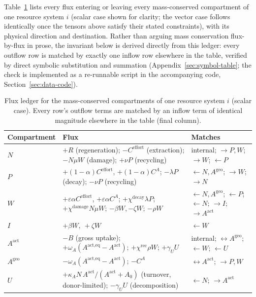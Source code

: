 \documentclass[twocolumn,10pt]{article}
\begin{document}
Table~\ref{tab:ledger} lists every flux entering or leaving every mass-conserved compartment of one resource system $i$ (scalar case shown for clarity; the vector case follows identically once the tensors above satisfy their stated constraints), with its physical direction and destination. Rather than arguing mass conservation flux-by-flux in prose, the invariant below is derived directly from this ledger: every outflow row is matched by exactly one inflow row elsewhere in the table, verified by direct symbolic substitution and summation (Appendix~\ref{sec:symbol-table}; the check is implemented as a re-runnable script in the accompanying code, Section~\ref{sec:data-code}).
\begin{table}[h]
\centering
\small
\caption{Flux ledger for the mass-conserved compartments of one resource system $i$ (scalar case). Every row's outflow terms are matched by an inflow term of identical magnitude elsewhere in the table (final column).}
\label{tab:ledger}
\begin{tabular}{lp{4.3cm}l}
\toprule
\textbf{Compartment} & \textbf{Flux} & \textbf{Matches} \\
\midrule
$N$ & $+R$ (regeneration); $-C^{\text{effort}}$ (extraction); $-N\mu W$ (damage); $+\nu P$ (recycling) & internal; $\to P,W$; $\to W$; $\leftarrow P$ \\
\midrule
$P$ & $+(1-\alpha)C^{\text{effort}}$, $+(1-\alpha)C^A$; $-\lambda P$ (decay); $-\nu P$ (recycling) & $\leftarrow N,A^{\text{geo}}$; $\to W$; $\to N$ \\
\midrule
$W$ & $+\varepsilon\alpha C^{\text{effort}}$, $+\varepsilon\alpha C^A$; $+\chi^{\text{decay}}\lambda P$; $+\chi^{\text{damage}} N\mu W$; $-\beta W,-\zeta W$; $-\rho W$ & $\leftarrow N,A^{\text{geo}}$; $\leftarrow P$; $\leftarrow N$; $\to I$; $\to A^{\text{act}}$ \\
\midrule
$I$ & $+\beta W,\ +\zeta W$ & $\leftarrow W$ \\
\midrule
$A^{\text{act}}$ & $-B$ (gross uptake); $+\omega_A(A^{\text{act,eq}}-A^{\text{act}})$; $+\chi^{\text{rec}}\rho W$; $+\gamma_U U$ & internal; $\leftrightarrow A^{\text{geo}}$; $\leftarrow W$; $\leftarrow U$ \\
\midrule
$A^{\text{geo}}$ & $-\omega_A(A^{\text{act,eq}}-A^{\text{act}})$; $-C^A$ & $\leftrightarrow A^{\text{act}}$; $\to P,W$ \\
\midrule
$U$ & $+\kappa_A N\,A^{\text{act}}/(A^{\text{act}}+A_0)$ (turnover, donor-limited); $-\gamma_U U$ (decomposition) & $\leftarrow N$; $\to A^{\text{act}}$ \\
\bottomrule
\end{tabular}
\end{table}
\end{document}
